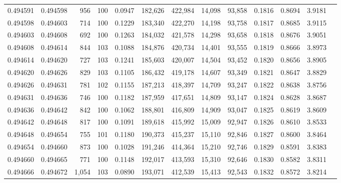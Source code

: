 \begin{tabular}{rrrrrrrrrrrrr}
0.494591 & 0.494598 &   956 & 100 &                                     0.0947 & 182,626 & 422,984 &  14,098 &  93,858 & 0.1816 & 0.8694 & 3.9181 \\
0.494598 & 0.494603 &   714 & 100 &                                     0.1229 & 183,340 & 422,270 &  14,198 &  93,758 & 0.1817 & 0.8685 & 3.9115 \\
0.494603 & 0.494608 &   692 & 100 &                                     0.1263 & 184,032 & 421,578 &  14,298 &  93,658 & 0.1818 & 0.8676 & 3.9051 \\
0.494608 & 0.494614 &   844 & 103 &                                     0.1088 & 184,876 & 420,734 &  14,401 &  93,555 & 0.1819 & 0.8666 & 3.8973 \\
0.494614 & 0.494620 &   727 & 103 &                                     0.1241 & 185,603 & 420,007 &  14,504 &  93,452 & 0.1820 & 0.8656 & 3.8905 \\
0.494620 & 0.494626 &   829 & 103 &                                     0.1105 & 186,432 & 419,178 &  14,607 &  93,349 & 0.1821 & 0.8647 & 3.8829 \\
0.494626 & 0.494631 &   781 & 102 &                                     0.1155 & 187,213 & 418,397 &  14,709 &  93,247 & 0.1822 & 0.8638 & 3.8756 \\
0.494631 & 0.494636 &   746 & 100 &                                     0.1182 & 187,959 & 417,651 &  14,809 &  93,147 & 0.1824 & 0.8628 & 3.8687 \\
0.494636 & 0.494642 &   842 & 100 &                                     0.1062 & 188,801 & 416,809 &  14,909 &  93,047 & 0.1825 & 0.8619 & 3.8609 \\
0.494642 & 0.494648 &   817 & 100 &                                     0.1091 & 189,618 & 415,992 &  15,009 &  92,947 & 0.1826 & 0.8610 & 3.8533 \\
0.494648 & 0.494654 &   755 & 101 &                                     0.1180 & 190,373 & 415,237 &  15,110 &  92,846 & 0.1827 & 0.8600 & 3.8464 \\
0.494654 & 0.494660 &   873 & 100 &                                     0.1028 & 191,246 & 414,364 &  15,210 &  92,746 & 0.1829 & 0.8591 & 3.8383 \\
0.494660 & 0.494665 &   771 & 100 &                                     0.1148 & 192,017 & 413,593 &  15,310 &  92,646 & 0.1830 & 0.8582 & 3.8311 \\
0.494666 & 0.494672 & 1,054 & 103 &                                     0.0890 & 193,071 & 412,539 &  15,413 &  92,543 & 0.1832 & 0.8572 & 3.8214 \\

\end{tabular}
